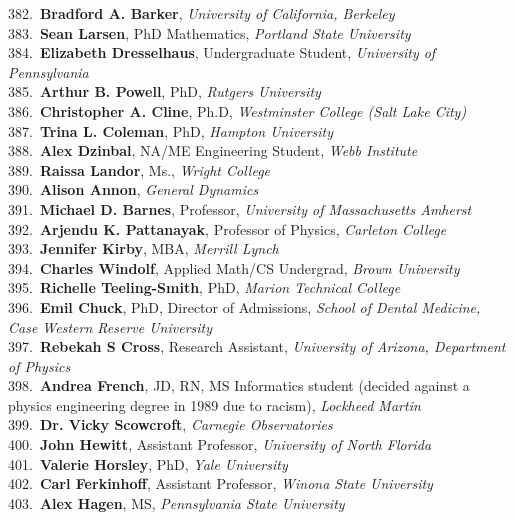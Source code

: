 382.~{\bf Bradford A. Barker}, {\sl University of California, Berkeley} \\
383.~{\bf Sean Larsen}, PhD Mathematics, {\sl Portland State University} \\
384.~{\bf Elizabeth Dresselhaus}, Undergraduate Student, {\sl University of Pennsylvania} \\
385.~{\bf Arthur B. Powell}, PhD, {\sl Rutgers University} \\
386.~{\bf Christopher A. Cline}, Ph.D, {\sl Westminster College (Salt Lake City)} \\
387.~{\bf Trina L. Coleman}, PhD, {\sl Hampton University} \\
388.~{\bf Alex Dzinbal}, NA/ME Engineering Student, {\sl Webb Institute} \\
389.~{\bf Raissa Landor}, Ms., {\sl Wright College} \\
390.~{\bf Alison Annon}, {\sl General Dynamics} \\
391.~{\bf Michael D. Barnes}, Professor, {\sl University of Massachusetts Amherst} \\
392.~{\bf Arjendu K. Pattanayak}, Professor of Physics, {\sl Carleton College} \\
393.~{\bf Jennifer Kirby}, MBA, {\sl Merrill Lynch} \\
394.~{\bf Charles Windolf}, Applied Math/CS Undergrad, {\sl Brown University} \\
395.~{\bf Richelle Teeling-Smith}, PhD, {\sl Marion Technical College} \\
396.~{\bf Emil Chuck}, PhD, Director of Admissions, {\sl School of Dental Medicine, Case Western Reserve University} \\
397.~{\bf Rebekah S Cross}, Research Assistant, {\sl University of Arizona, Department of Physics} \\
398.~{\bf Andrea French}, JD, RN, MS Informatics student (decided against a physics engineering degree in 1989 due to racism), {\sl Lockheed Martin} \\
399.~{\bf Dr. Vicky Scowcroft}, {\sl Carnegie Observatories} \\
400.~{\bf John Hewitt}, Assistant Professor, {\sl University of North Florida} \\
401.~{\bf Valerie Horsley}, PhD, {\sl Yale University} \\
402.~{\bf Carl Ferkinhoff}, Assistant Professor, {\sl Winona State University} \\
403.~{\bf Alex Hagen}, MS, {\sl Pennsylvania State University} \\

